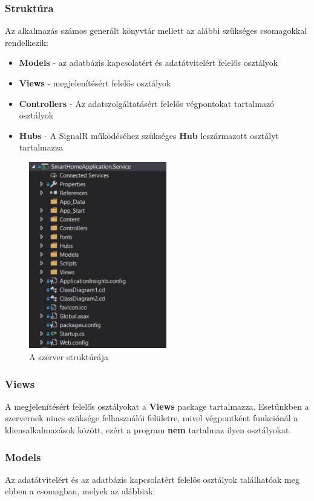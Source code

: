 \documentclass[a4paper,12pt]{report}
\begin{document}
\subsubsection{Struktúra}
    Az alkalmazás számos generált könyvtár mellett az alábbi szükséges csomagokkal rendelkezik:

 \begin{itemize}
     \item \textbf{Models} - az adatbázis kapcsolatért és adatátvitelért felelős osztályok
     \item \textbf{Views} - megjelenítésért felelős osztályok
     \item \textbf{Controllers} - Az adatszolgáltatásért felelős végpontokat tartalmazó osztályok
     \item \textbf{Hubs} - A SignalR működéséhez szükséges \textbf{Hub} leszármazott osztályt tartalmazza
 \end{itemize}

\begin{figure}[H]
    \centering
    \includegraphics[width=6cm,keepaspectratio]{images/servicestructure.jpg}
    \caption{A szerver struktúrája}
    \label{fig: ServiceStructure}
\end{figure}

\subsubsection{Views}
    A megjelenítésért felelős osztályokat a \textbf{Views} package tartalmazza. Esetünkben a szervernek nincs szüksége
    felhasználói felületre, mivel végpontként funkciónál a kliensalkalmazások között, ezért a program \textbf{nem} tartalmaz
    ilyen osztályokat.

\subsubsection{Models}
    Az adatátvitelért és az adatbázis kapcsolatért felelős osztályok találhatóak meg ebben a csomagban, melyek az alábbiak:
\end{document}
